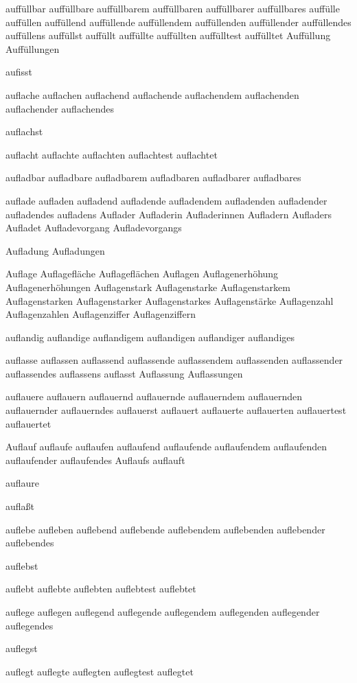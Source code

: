 auffüllbar auffüllbare auffüllbarem auffüllbaren auffüllbarer auffüllbares auffülle auffüllen auffüllend auffüllende auffüllendem auffüllenden auffüllender auffüllendes auffüllens auffüllst auffüllt auffüllte auffüllten auffülltest auffülltet Auffüllung Auffüllungen

aufisst

auflache auflachen auflachend auflachende auflachendem auflachenden auflachender auflachendes

auflachst

auflacht auflachte auflachten auflachtest auflachtet

aufladbar aufladbare aufladbarem aufladbaren aufladbarer aufladbares

auflade aufladen aufladend aufladende aufladendem aufladenden aufladender aufladendes aufladens Auflader Aufladerin Aufladerinnen Aufladern Aufladers Aufladet Aufladevorgang Aufladevorgangs

Aufladung Aufladungen

Auflage Auflagefläche Auflageflächen Auflagen Auflagenerhöhung Auflagenerhöhungen Auflagenstark Auflagenstarke Auflagenstarkem Auflagenstarken Auflagenstarker Auflagenstarkes Auflagenstärke Auflagenzahl Auflagenzahlen Auflagenziffer Auflagenziffern

auflandig auflandige auflandigem auflandigen auflandiger auflandiges

auflasse auflassen auflassend auflassende auflassendem auflassenden auflassender auflassendes auflassens auflasst Auflassung Auflassungen

auflauere auflauern auflauernd auflauernde auflauerndem auflauernden auflauernder auflauerndes auflauerst auflauert auflauerte auflauerten auflauertest auflauertet

Auflauf auflaufe auflaufen auflaufend auflaufende auflaufendem auflaufenden auflaufender auflaufendes Auflaufs auflauft

auflaure

auflaßt

auflebe aufleben auflebend auflebende auflebendem auflebenden auflebender auflebendes

auflebst

auflebt auflebte auflebten auflebtest auflebtet

auflege auflegen auflegend auflegende auflegendem auflegenden auflegender auflegendes

auflegst

auflegt auflegte auflegten auflegtest auflegtet

